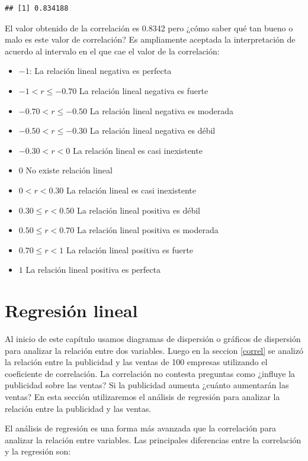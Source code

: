 \documentclass[letterpaper,]{book}
\providecommand{\tightlist}{%
  \setlength{\itemsep}{0pt}\setlength{\parskip}{0pt}}
\begin{document}
\begin{verbatim}
## [1] 0.834188
\end{verbatim}

El valor obtenido de la correlación es 0.8342 pero ¿cómo saber qué tan bueno o malo es este valor de correlación? Es ampliamente aceptada la interpretación de acuerdo al intervalo en el que cae el valor de la correlación:

\begin{itemize}
\tightlist
\item
  \(-1\): La relación lineal negativa es perfecta
\item
  \(-1<r \leq -0.70\) La relación lineal negativa es fuerte
\item
  \(-0.70<r \leq -0.50\) La relación lineal negativa es moderada
\item
  \(-0.50<r \leq -0.30\) La relación lineal negativa es débil
\item
  \(-0.30<r < 0\) La relación lineal es casi inexistente
\item
  \(0\) No existe relación lineal
\item
  \(0<r < 0.30\) La relación lineal es casi inexistente
\item
  \(0.30 \leq r < 0.50\) La relación lineal positiva es débil
\item
  \(0.50 \leq r < 0.70\) La relación lineal positiva es moderada
\item
  \(0.70 \leq r < 1\) La relación lineal positiva es fuerte
\item
  \(1\) La relación lineal positiva es perfecta
\end{itemize}

\hypertarget{regresion-lineal}{%
\section{Regresión lineal}\label{regresion-lineal}}

Al inicio de este capítulo usamos diagramas de dispersión o gráficos de dispersión para analizar la relación entre dos variables. Luego en la seccion \ref{correl} se analizó la relación entre la publicidad y las ventas de 100 empresas utilizando el coeficiente de correlación. La correlación no contesta preguntas como ¿influye la publicidad sobre las ventas? Si la publicidad aumenta ¿cuánto aumentarán las ventas? En esta sección utilizaremos el análisis de regresión para analizar la relación entre la publicidad y las ventas.

El análisis de regresión es una forma más avanzada que la correlación para analizar la relación entre variables. Las principales diferencias entre la correlación y la regresión son:
\end{document}
